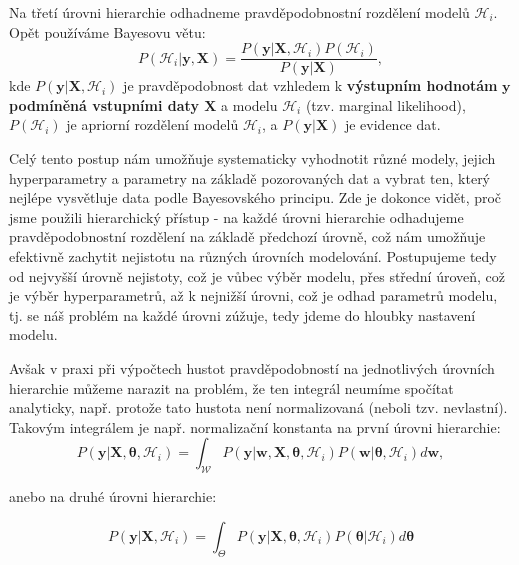 Na třetí úrovni hierarchie odhadneme pravděpodobnostní rozdělení modelů $\mathcal{H}_i$.
Opět používáme Bayesovu větu:
\begin{equation}
  P(\mathcal{H}_i | \mathbf{y}, \mathbf{X}) = \frac{P( \mathbf{y} | \mathbf{X}, \mathcal{H}_i) P(\mathcal{H}_i)}{P(\mathbf{y} |\mathbf{X})},     
\end{equation}
kde $P( \mathbf{y} | \mathbf{X}, \mathcal{H}_i)$ je pravděpodobnost dat vzhledem k \textbf{výstupním hodnotám} $\mathbf{y}$ \textbf{podmíněná vstupními daty $\mathbf{X}$} a modelu $\mathcal{H}_i$ (tzv. marginal likelihood), $P(\mathcal{H}_i)$ je apriorní rozdělení modelů $\mathcal{H}_i$, a $P(\mathbf{y} |\mathbf{X})$ je evidence dat.
\par
Celý tento postup nám umožňuje systematicky vyhodnotit různé modely, jejich hyperparametry a parametry na základě pozorovaných dat a vybrat ten, který nejlépe vysvětluje data podle Bayesovského principu.
Zde je dokonce vidět, proč jsme použili hierarchický přístup - na každé úrovni hierarchie odhadujeme pravděpodobnostní rozdělení na základě předchozí úrovně, což nám umožňuje efektivně zachytit nejistotu na různých úrovních modelování.
Postupujeme tedy od nejvyšší úrovně nejistoty, což je vůbec výběr modelu, přes střední úroveň, což je výběr hyperparametrů, až k nejnižší úrovni, což je odhad parametrů modelu, tj. se náš problém na každé úrovni zúžuje, tedy jdeme do hloubky nastavení modelu. 
\par

Avšak v praxi při výpočtech hustot pravděpodobností na jednotlivých úrovních hierarchie můžeme narazit na problém, že ten integrál neumíme spočítat analyticky, např. protože tato hustota není normalizovaná (neboli tzv. nevlastní).
Takovým integrálem je např. normalizační konstanta na první úrovni hierarchie:
\begin{equation}
  P(\mathbf{y} |\mathbf{X}, \boldsymbol{\theta}, \mathcal{H}_i) = \int_{\mathcal{W}} P( \mathbf{y} | \mathbf{w}, \mathbf{X}, \boldsymbol{\theta}, \mathcal{H}_i) P(\mathbf{w} | \boldsymbol{\theta}, \mathcal{H}_i) d\mathbf{w},
  \label{eq:normalizační_konst_1_uroven}
\end{equation}

anebo na druhé úrovni hierarchie:

\begin{equation}
  P(\mathbf{y} |\mathbf{X}, \mathcal{H}_i) = \int_{\Theta} P( \mathbf{y} | \mathbf{X}, \boldsymbol{\theta}, \mathcal{H}_i) P(\boldsymbol{\theta} | \mathcal{H}_i) d\boldsymbol{\theta}
  \label{eq:normalizační_konst_2_uroven}
\end{equation} 

